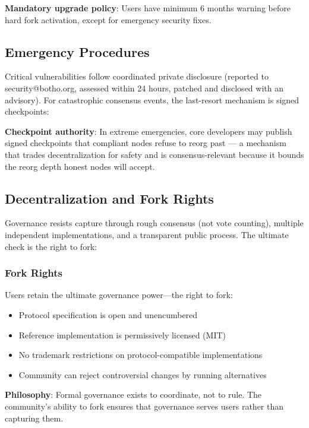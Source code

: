 \textbf{Mandatory upgrade policy}: Users have minimum 6 months warning
before hard fork activation, except for emergency security fixes.

\subsection{Emergency Procedures}

Critical vulnerabilities follow coordinated private disclosure (reported to
security@botho.org, assessed within 24 hours, patched and disclosed with an
advisory). For catastrophic consensus events, the last-resort mechanism is
signed checkpoints:

\textbf{Checkpoint authority}: In extreme emergencies, core developers may
publish signed checkpoints that compliant nodes refuse to reorg past --- a
mechanism that trades decentralization for safety and is consensus-relevant
because it bounds the reorg depth honest nodes will accept.

\subsection{Decentralization and Fork Rights}

Governance resists capture through rough consensus (not vote counting),
multiple independent implementations, and a transparent public process. The
ultimate check is the right to fork:

\subsubsection{Fork Rights}

Users retain the ultimate governance power---the right to fork:

\begin{itemize}
  \item Protocol specification is open and unencumbered
  \item Reference implementation is permissively licensed (MIT)
  \item No trademark restrictions on protocol-compatible implementations
  \item Community can reject controversial changes by running alternatives
\end{itemize}

\textbf{Philosophy}: Formal governance exists to coordinate, not to rule.
The community's ability to fork ensures that governance serves users rather
than capturing them.

